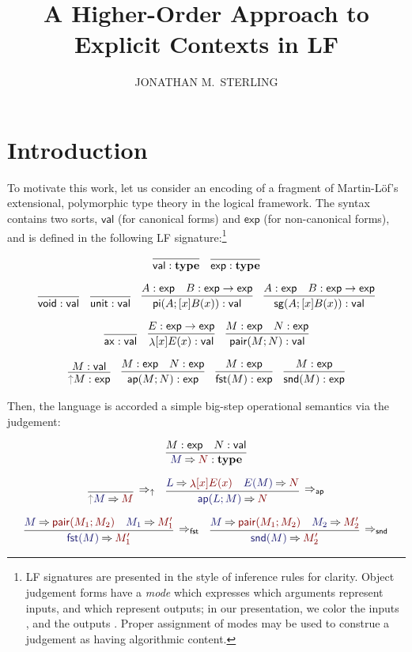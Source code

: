 \documentclass[acmtoplas]{acmtrans2m}
\title{A Higher-Order Approach to Explicit Contexts in LF}
\author{JONATHAN M.\ STERLING}
\def\InputModeColorName{MidnightBlue}
\def\OutputModeColorName{Maroon}
\newcommand\InputMode[1]{{\color{\InputModeColorName}{#1}}}
\newcommand\OutputMode[1]{{\color{\OutputModeColorName}{#1}}}
\newcommand\type{\mathbf{type}}
\newcommand\tyvoid{\mathsf{void}}
\newcommand\tyunit{\mathsf{unit}}
\newcommand\ax{\mathsf{ax}}
\newcommand\ap{\mathsf{ap}}
\newcommand\sortval{\mathsf{val}}
\newcommand\sortexp{\mathsf{exp}}
\newcommand\eval[2]{\InputMode{#1}\mathbin{\Rightarrow}\OutputMode{#2}}
\newcommand\thunk[1]{{\color{Gray}\uparrow}#1}
\newcommand\evalrule[1]{\Rightarrow_{#1}}
\DeclareMathOperator{\typi}{\mathsf{pi}}
\DeclareMathOperator{\tysg}{\mathsf{sg}}
\DeclareMathOperator{\lam}{\mathsf{\lambda}}
\DeclareMathOperator{\pair}{\mathsf{pair}}
\DeclareMathOperator{\fst}{\mathsf{fst}}
\DeclareMathOperator{\snd}{\mathsf{snd}}
\begin{document}
\maketitle

\section{Introduction}

To motivate this work, let us consider an encoding of a fragment of
Martin-L\"of's extensional, polymorphic type
theory\cite{Martin-Lof-1979} in the logical framework. The syntax
contains two sorts, $\sortval$ (for canonical forms) and $\sortexp$
(for non-canonical forms), and is defined in the following LF
signature:\footnote{LF signatures are presented in the style of
inference rules for clarity. Object judgement forms have a \emph{mode}
which expresses which arguments represent inputs, and which represent
outputs; in our presentation, we color the inputs
\emph{\InputMode\InputModeColorName}, and the outputs
\emph{\OutputMode\OutputModeColorName}. Proper assignment of modes may
be used to construe a judgement as having algorithmic content.}

\begin{gather*}
  \infer{\sortval:\type}{}
  \quad
  \infer{\sortexp:\type}{}\\[6pt]
  \infer{\tyvoid:\sortval}{}
  \quad
  \infer{\tyunit:\sortval}{}
  \quad
  \infer{
    \typi(A;[x]B(x)):\sortval
  }{
    A:\sortexp &
    B:\sortexp\to\sortexp
  }
  \quad
  \infer{
    \tysg(A;[x]B(x)):\sortval
  }{
    A:\sortexp &
    B:\sortexp\to\sortexp
  }\\[6pt]
  \infer{\ax:\sortval}{}
  \quad
  \infer{
    \lam[x]E(x):\sortval
  }{
    E:\sortexp\to\sortexp
  }
  \quad
  \infer{
    \pair(M;N):\sortval
  }{
    M:\sortexp &
    N:\sortexp
  } \\[6pt]
  \infer{
    \thunk{M}:\sortexp
  }{
    M:\sortval
  }
  \quad
  \infer{
    \ap(M;N):\sortexp
  }{
    M:\sortexp &
    N:\sortexp
  }
  \quad
  \infer{
    \fst(M):\sortexp
  }{
    M:\sortexp
  }
  \quad
  \infer{
    \snd(M):\sortexp
  }{
    M:\sortexp
  }
\end{gather*}


Then, the language is accorded a simple big-step operational semantics via the
\framebox{$\eval{M}{N}$} judgement:

\begin{gather*}
  \infer{
    \eval{M}{N}:\type
  }{
    M:\sortexp &
    N:\sortval
  }\\[6pt]
  \infer[\evalrule\uparrow]{
    \eval{\thunk{M}}{M}
  }{
  }
  \quad
  \infer[\evalrule\ap]{
    \eval{\ap(L;M)}{N}
  }{
    \eval{L}{\lam[x]E(x)} &
    \eval{E(M)}{N}
  }\\[6pt]
  \infer[\evalrule\fst]{
    \eval{\fst(M)}{M_1'}
  }{
    \eval{M}{\pair(M_1;M_2)} &
    \eval{M_1}{M_1'}
  }
  \quad
  \infer[\evalrule\snd]{
    \eval{\snd(M)}{M_2'}
  }{
    \eval{M}{\pair(M_1;M_2)} &
    \eval{M_2}{M_2'}
  }
\end{gather*}
\end{document}
